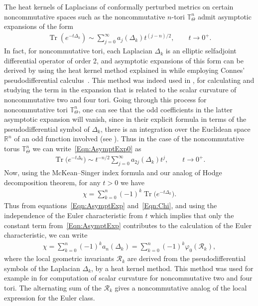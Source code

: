 \documentclass[pdftex]{sigma}
\newcommand{\Rr}{\mathcal{R}}
\DeclareMathOperator{\Tr}{Tr}
\numberwithin{equation}{section}
\begin{document}
The heat kernels of Laplacians of conformally perturbed metrics on certain noncommutative spaces such as the noncommutative $n$-tori $\mathbb{T}_{\Theta}^n$ admit asymptotic expansions of the form
\begin{gather}
\label{Eqn:AsymptExp0}
\Tr( e^{-t \Delta_k}) \sim \sum_{j=0}^\infty a_j( \Delta_k) t^{(j-n)/2}, \qquad t \to 0^+.
\end{gather}
In fact, for noncommutative tori, each Laplacian $\Delta_k$ is an elliptic selfadjoint dif\/ferential operator of order 2, and
asymptotic expansions of this form can be derived by using
the heat kernel method explained in \cite{Gilkey} while employing Connes' pseudodif\/ferential calculus~\cite{CAlgGeoDiff}.
This method was indeed used in
\cite{ModCurvCM,GaussBonnet-ConnesTretkoff, GaussBonnet-FK, ScalarCurvNCtorusFK, ScalarCurv4NCTFK}, for
calculating and studying the term in the expansion that is related to the scalar curvature of noncommutative two and four tori.
Going through this process for noncommutative tori $\mathbb{T}_{\Theta}^n$, one can see that the odd coef\/f\/icients
in the latter asymptotic expansion will vanish, since in their explicit formula in terms of the pseudodif\/ferential symbol
of $\Delta_k$, there is an integration over the Euclidean space $\mathbb{R}^n$ of an odd function involved (see \cite[p.~54 and Theorem~1.7.6, p.~58]{Gilkey}). Thus in the case of the noncommutative torus $\mathbb{T}_{\Theta}^n$ we can write~\eqref{Eqn:AsymptExp0} as
\begin{gather}
\label{Eqn:AsymptExp}
\Tr\big( e^{-t \Delta_k}\big) \sim t^{-n/2} \sum_{j=0}^\infty a_{2j} ( \Delta_k) t^j, \qquad t \to 0^+.
\end{gather}
Now, using the McKean--Singer index formula \cite[Lemma~1.6.5, p.~47]{Gilkey} and our analog of Hodge decomposition theorem, for any $t > 0$ we have
\begin{gather}
\label{Eqn:Chi}
\chi = \sum_{k=0}^n (-1)^k \Tr\big( e^{-t \Delta_k}\big).
\end{gather}
Thus from equations~\eqref{Eqn:AsymptExp} and~\eqref{Eqn:Chi}, and using the independence
of the Euler characteristic from $t$ which implies that only the constant term from~\eqref{Eqn:AsymptExp} contributes
to the calculation of the Euler characteristic, we can write
\begin{gather*}
\chi = \sum_{k=0}^n (-1)^k a_{n}(\Delta_k) = \sum_{k=0}^n (-1)^k \varphi_0(\Rr_k),
\end{gather*}
where the local geometric invariants $\Rr_k$ are derived from the pseudodif\/ferential symbols of the Laplacian $\Delta_k$, by a heat kernel method. This method was used for example in \cite{ModCurvCM, ScalarCurvNCtorusFK, ScalarCurv4NCTFK} for computation of scalar curvature for noncommutative two
and four tori. The alternating sum of the $\Rr_k$ gives a noncommutative analog of the local expression for the Euler class.
\end{document}

